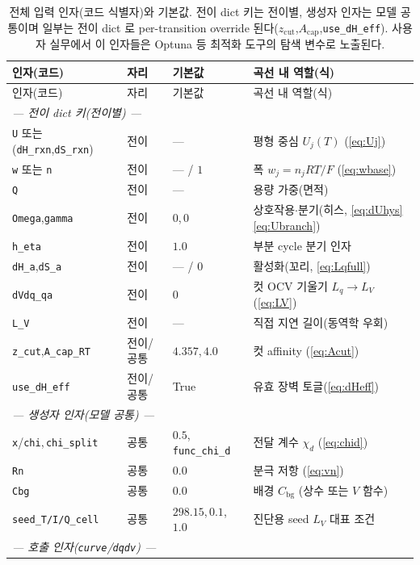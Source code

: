 \documentclass[11pt,a4paper]{article}
\newcommand{\bg}{\mathrm{bg}}
\newcommand{\code}[1]{\texttt{#1}}
\begin{document}
\begingroup
\footnotesize
\renewcommand{\arraystretch}{1.18}
\begin{longtable}{l l l l}
\caption{전체 입력 인자(코드 식별자)와 기본값. 전이 dict 키는 전이별, 생성자 인자는 모델 공통이며 일부는 전이 dict 로
per-transition override 된다($z_\mathrm{cut}$,$A_\mathrm{cap}$,\code{use\_dH\_eff}). 사용자 실무에서 이 인자들은
Optuna 등 최적화 도구의 탐색 변수로 노출된다.}\label{tab:inputs}\\
\toprule
인자(코드) & 자리 & 기본값 & 곡선 내 역할(식) \\
\midrule
\endfirsthead
\toprule
인자(코드) & 자리 & 기본값 & 곡선 내 역할(식) \\
\midrule
\endhead
\multicolumn{4}{l}{\emph{— 전이 dict 키(전이별) —}}\\
\code{U} 또는 (\code{dH\_rxn},\code{dS\_rxn}) & 전이 & --- & 평형 중심 $U_j(T)$ (\eqref{eq:Uj}) \\
\code{w} 또는 \code{n} & 전이 & --- / $1$ & 폭 $w_j=n_jRT/F$ (\eqref{eq:wbase}) \\
\code{Q} & 전이 & --- & 용량 가중(면적) \\
\code{Omega},\code{gamma} & 전이 & $0$,\,$0$ & 상호작용$\cdot$분기(히스, \eqref{eq:dUhys}\eqref{eq:Ubranch}) \\
\code{h\_eta} & 전이 & $1.0$ & 부분 cycle 분기 인자 \\
\code{dH\_a},\code{dS\_a} & 전이 & --- / $0$ & 활성화(꼬리, \eqref{eq:Lqfull}) \\
\code{dVdq\_qa} & 전이 & $0$ & 컷 OCV 기울기 $L_q\!\to\!L_V$ (\eqref{eq:LV}) \\
\code{L\_V} & 전이 & --- & 직접 지연 길이(동역학 우회) \\
\code{z\_cut},\code{A\_cap\_RT} & 전이/공통 & $4.357$,\,$4.0$ & 컷 affinity (\eqref{eq:Acut}) \\
\code{use\_dH\_eff} & 전이/공통 & True & 유효 장벽 토글(\eqref{eq:dHeff}) \\
\multicolumn{4}{l}{\emph{— 생성자 인자(모델 공통) —}}\\
\code{x}/\code{chi},\,\code{chi\_split} & 공통 & $0.5$,\,\code{func\_chi\_d} & 전달 계수 $\chi_d$ (\eqref{eq:chid}) \\
\code{Rn} & 공통 & $0.0$ & 분극 저항 (\eqref{eq:vn}) \\
\code{Cbg} & 공통 & $0.0$ & 배경 $C_\bg$ (상수 또는 $V$ 함수) \\
\code{seed\_T/I/Q\_cell} & 공통 & $298.15$,\,$0.1$,\,$1.0$ & 진단용 seed $L_V$ 대표 조건 \\
\multicolumn{4}{l}{\emph{— 호출 인자(\code{curve}/\code{dqdv}) —}}\\

\end{longtable}
\end{document}

